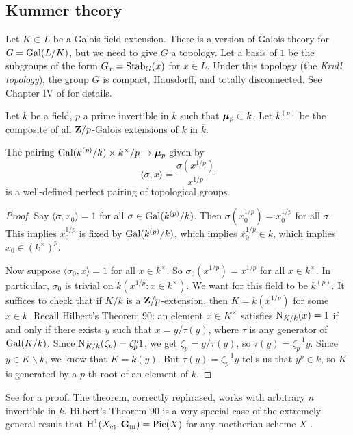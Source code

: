 \subsection{Kummer theory}

Let $K\subset L$ be a Galois field extension. There is a version of Galois 
theory for $G=\operatorname{Gal}(L/K)$, but we need to give $G$ a topology. Let a basis 
of $1$ be the subgroups of the form $G_x=\operatorname{Stab}_G(x)$ for $x\in L$. Under 
this topology (the \emph{Krull topology}), the group $G$ is compact, Hausdorff, 
and totally disconnected. See Chapter IV of \cite{neukirch-1999} for details. 

Let $k$ be a field, $p$ a prime invertible in $k$ such that ${\bm\mu}_p\subset k$. 
Let $k^{(p)}$ be the composite of all $\mathbf{Z}/p$-Galois extensions of $k$ in 
$\overline k$. 

\begin{theorem}
The pairing $\operatorname{Gal}(k^{(p)}/k)\times k^\times/p \to {\bm\mu}_p$ given by 
\[
  \langle \sigma,x\rangle = \frac{\sigma(x^{1/p})}{x^{1/p}} 
\]
is a well-defined perfect pairing of topological groups. 
\end{theorem}
\begin{proof}
Say $\langle \sigma,x_0\rangle=1$ for all $\sigma\in \operatorname{Gal}(k^{(p)}/k)$. Then 
$\sigma(x_0^{1/p})=x_0^{1/p}$ for all $\sigma$. This implies 
$x_0^{1/p}$ is fixed by $\operatorname{Gal}(k^{(p)}/k)$, which implies 
$x_0^{1/p}\in k$, which implies $x_0\in (k^\times)^p$. 

Now suppose $\langle \sigma_0,x\rangle = 1$ for all $x\in k^\times$. So 
$\sigma_0(x^{1/p})=x^{1/p}$ for all $x\in k^\times$. In particular, $\sigma_0$ 
is trivial on $k(x^{1/p}:x\in k^\times)$. We want for this field to be 
$k^{(p)}$. It suffices to check that if $K/k$ is a $\mathbf{Z}/p$-extension, then 
$K=k(x^{1/p})$ for some $x\in k$. Recall Hilbert's Theorem 90: an element 
$x\in K^\times$ satisfies $\operatorname{N}_{K/k}(x)=1$ if and only if there exists $y$ 
such that $x=y/\tau(y)$, where $\tau$ is any generator of $\operatorname{Gal}(K/k)$. Since 
$\operatorname{N}_{K/k}(\zeta_p)=\zeta_p^p1$, we get $\zeta_p=y/\tau(y)$, so 
$\tau(y)=\zeta_p^{-1} y$. Since $y\in K\smallsetminus k$, we know that 
$K=k(y)$. But $\tau(y)=\zeta_p^{-1} y$ tells us that $y^p\in k$, so $K$ is 
generated by a $p$-th root of an element of $k$. 
\end{proof}

See \cite[IV \S 3]{neukirch-1999} for a proof. The theorem, correctly 
rephrased, works with arbitrary $n$ invertible in $k$. Hilbert's Theorem 90 is 
a very special case of the extremely general result that 
$\operatorname{H}^1(X_{\textnormal{\'et}},\mathbf{G}_\mathrm{m}) = \operatorname{Pic}(X)$ for any noetherian scheme $X$ 
\cite[I 2.2.3]{sga4-5}. 

